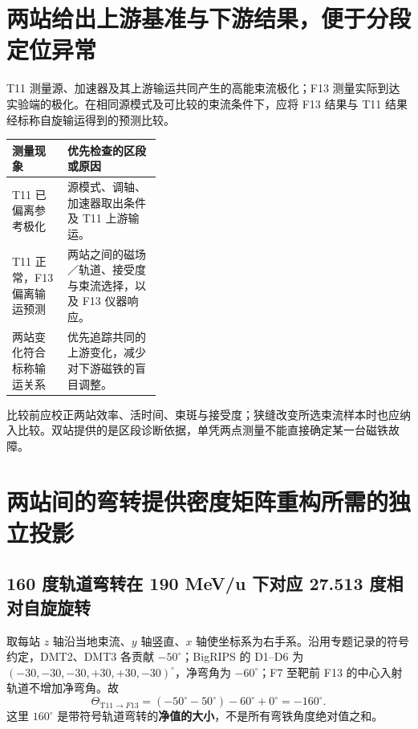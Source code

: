 \documentclass[UTF8,11pt,a4paper,fontset=none]{ctexart}
\begin{document}
\section{两站给出上游基准与下游结果，便于分段定位异常}

T11 测量源、加速器及其上游输运共同产生的高能束流极化；F13 测量实际到达实验端的极化。在相同源模式及可比较的束流条件下，应将 F13 结果与 T11 结果经标称自旋输运得到的预测比较。

\begingroup\small\noindent
\begin{tabularx}{\linewidth}{@{}p{0.37\linewidth}Y@{}}
\toprule
测量现象 & 优先检查的区段或原因 \\
\midrule
T11 已偏离参考极化 & 源模式、调轴、加速器取出条件及 T11 上游输运。\\
T11 正常，F13 偏离输运预测 & 两站之间的磁场／轨道、接受度与束流选择，以及 F13 仪器响应。\\
两站变化符合标称输运关系 & 优先追踪共同的上游变化，减少对下游磁铁的盲目调整。\\
\bottomrule
\end{tabularx}
\endgroup

比较前应校正两站效率、活时间、束斑与接受度；狭缝改变所选束流样本时也应纳入比较。双站提供的是区段诊断依据，单凭两点测量不能直接确定某一台磁铁故障。

\clearpage
\section{两站间的弯转提供密度矩阵重构所需的独立投影}

\subsection{160 度轨道弯转在 190 MeV/u 下对应 27.513 度相对自旋旋转}

取每站 $z$ 轴沿当地束流、$y$ 轴竖直、$x$ 轴使坐标系为右手系。沿用专题记录的符号约定，DMT2、DMT3 各贡献 $-50^\circ$；BigRIPS 的 D1--D6 为 $(-30,-30,-30,+30,+30,-30)^\circ$，净弯角为 $-60^\circ$；F7 至靶前 F13 的中心入射轨道不增加净弯角\cite{local,geometry}。故
\begin{equation}
 \Theta_{\mathrm{T11}\to F13}=(-50^\circ-50^\circ)-60^\circ+0^\circ=-160^\circ.
\end{equation}
这里 $160^\circ$ 是带符号轨道弯转的\textbf{净值的大小}，不是所有弯铁角度绝对值之和。
\end{document}
